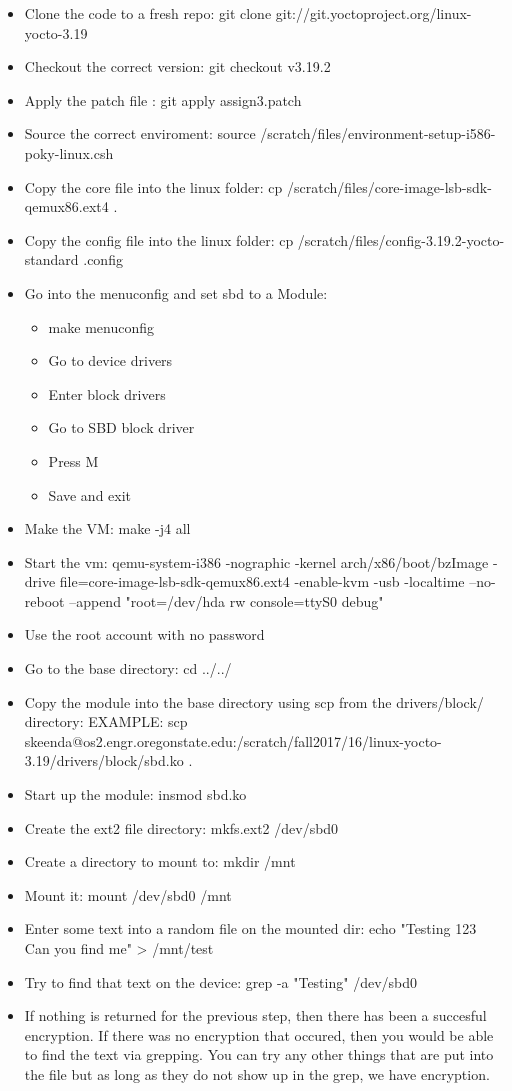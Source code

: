 \documentclass[10pt,drafclsnofoot,onecolumn]{article}
\begin{document}
\begin{itemize}
\item Clone the code to a fresh repo: git clone git://git.yoctoproject.org/linux-yocto-3.19
\item Checkout the correct version: git checkout v3.19.2
\item Apply the patch file : git apply assign3.patch
\item Source the correct enviroment: source /scratch/files/environment-setup-i586-poky-linux.csh
\item Copy the core file into the linux folder: cp /scratch/files/core-image-lsb-sdk-qemux86.ext4 .
\item Copy the config file into the linux folder: cp /scratch/files/config-3.19.2-yocto-standard .config
\item Go into the menuconfig and set sbd to a Module:
	\begin{itemize}
	\item make menuconfig
	\item Go to device drivers
	\item Enter block drivers
	\item Go to SBD block driver
	\item Press M
	\item Save and exit
	\end{itemize}
\item Make the VM: make -j4 all
\item Start the vm: qemu-system-i386 -nographic -kernel arch/x86/boot/bzImage -drive file=core-image-lsb-sdk-qemux86.ext4 -enable-kvm -usb -localtime --no-reboot --append "root=/dev/hda rw console=ttyS0 debug"
\item Use the root account with no password
\item Go to the base directory: cd ../../
\item Copy the module into the base directory using scp from the drivers/block/ directory: EXAMPLE: scp skeenda@os2.engr.oregonstate.edu:/scratch/fall2017/16/linux-yocto-3.19/drivers/block/sbd.ko .
\item Start up the module: insmod sbd.ko
\item Create the ext2 file directory: mkfs.ext2 /dev/sbd0
\item Create a directory to mount to: mkdir /mnt
\item Mount it: mount /dev/sbd0 /mnt
\item Enter some text into a random file on the mounted dir: echo "Testing 123 Can you find me" > /mnt/test
\item Try to find that text on the device: grep -a "Testing" /dev/sbd0
\item If nothing is returned for the previous step, then there has been a succesful encryption. If there was no encryption that occured, then you would be able to find the text via grepping. You can try any other things that are put into the file but as long as they do not show up in the grep, we have encryption.

\end{itemize}
\end{document}
